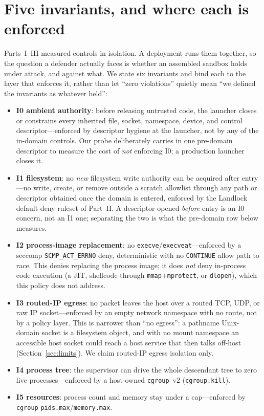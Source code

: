 \documentclass[11pt]{article}
\begin{document}
\section{Five invariants, and where each is enforced}\label{sec:composed}

Parts~I--III measured controls in isolation. A deployment runs them together, so the question a defender
actually faces is whether an assembled sandbox holds under attack, and against what. We state six
invariants and bind each to the layer that enforces it, rather than let ``zero violations'' quietly mean
``we defined the invariants as whatever held'':

\begin{itemize}[leftmargin=1.4em,itemsep=1pt]
\item \textbf{I0 ambient authority}: before releasing untrusted code, the launcher closes or constrains
every inherited file, socket, namespace, device, and control descriptor---enforced by descriptor hygiene
at the launcher, not by any of the in-domain controls. Our probe deliberately carries in one pre-domain
descriptor to measure the cost of \emph{not} enforcing I0; a production launcher closes it.
\item \textbf{I1 filesystem}: no \emph{new} filesystem write authority can be acquired after entry---no
write, create, or remove outside a scratch allowlist through any path or descriptor obtained once the
domain is entered, enforced by the Landlock default-deny ruleset of Part~II. A descriptor opened
\emph{before} entry is an I0 concern, not an I1 one; separating the two is what the pre-domain row below
measures.
\item \textbf{I2 process-image replacement}: no \texttt{execve}/\texttt{execveat}---enforced by a seccomp
\texttt{SCMP\_ACT\_ERRNO} deny, deterministic with no \texttt{CONTINUE} allow path to race. This denies
replacing the process image; it does \emph{not} deny in-process code execution (a JIT, shellcode through
\texttt{mmap}+\texttt{mprotect}, or \texttt{dlopen}), which this policy does not address.
\item \textbf{I3 routed-IP egress}: no packet leaves the host over a routed TCP, UDP, or raw IP
socket---enforced by an empty network namespace with no route, not by a policy layer. This is narrower
than ``no egress'': a pathname Unix-domain socket is a filesystem object, and with no mount namespace an
accessible host socket could reach a host service that then talks off-host (Section~\ref{sec:limits}). We
claim routed-IP egress isolation only.
\item \textbf{I4 process tree}: the supervisor can drive the whole descendant tree to zero live
processes---enforced by a host-owned \texttt{cgroup}~v2 (\texttt{cgroup.kill}).
\item \textbf{I5 resources}: process count and memory stay under a cap---enforced by \texttt{cgroup}
\texttt{pids.max}/\texttt{memory.max}.
\end{itemize}
\end{document}
